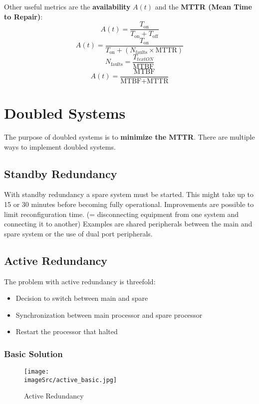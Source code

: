 \documentclass[../main.tex]{subfiles}
\renewcommand{\imageSrc}{../images/}
\begin{document}
Other useful metrics are the \textbf{availability} $A(t)$ and the \textbf{MTTR (Mean Time to Repair)}:
\[
A(t) = \frac{T_{\text{on}}}{T_{\text{on}} + T_{\text{off}}}
\]
\[
A(t) = \frac{T_{\text{on}}}{T_{\text{on}} + (N_{\text{faults}} \times \text{MTTR})}
\]
\[
N_{\text{faults}} = \frac{T_{text{ON}}}{\text{MTBF}}
\]
\[
A(t) = \frac{\text{MTBF}}{\text{MTBF} + \text{MTTR}}
\]
\section{Doubled Systems}
The purpose of doubled systems is to \textbf{minimize the MTTR}. There are multiple ways to implement doubled systems.

\subsection{Standby Redundancy}
With standby redundancy a spare system must be started. This might take up to 15 or 30 minutes before becoming fully operational. Improvements are possible to limit reconfiguration time. (= disconnecting equipment from one system and connecting it to another) Examples are shared peripherals between the main and spare system or the use of dual port peripherals.

\subsection{Active Redundancy}
The problem with active redundancy is threefold:
\begin{itemize}
	\item Decision to switch between main and spare
	\item Synchronization between main processor and spare processor
	\item Restart the processor that halted
\end{itemize}



\subsubsection{Basic Solution}
\begin{figure}[h!]
    \centering
    \texttt{[image: \\imageSrc/active\_basic.jpg]}
    \caption{Active Redundancy}
    \label{acre}
\end{figure}
\end{document}

